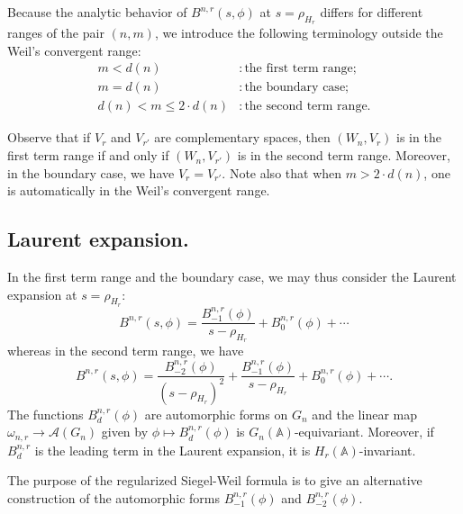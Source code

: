 \documentclass[10pt]{amsart}
\theoremstyle{plain}
\numberwithin{equation}{section}
\begin{document}
Because the analytic behavior of $B^{n,r}(s, \phi)$  at $s=\rho_{H_r}$
differs for different ranges of the pair $(n, m)$, we introduce the
following terminology outside the Weil's convergent range:
\begin{align*}
m<d(n)&:\text{the first term range};\\
m=d(n)&:\text{the boundary case};\\
d(n)<m\leq 2\cdot d(n)&:\text{the second term range}.
\end{align*}

Observe that if $V_r$ and $V_{r'}$ are complementary spaces, then
$(W_n, V_r)$ is in the first term range if and only if $(W_n, V_{r'})$
is in the second term range. Moreover, in the boundary case, we have
$V_r = V_{r'}$. Note also that when $m > 2 \cdot d(n)$, one is automatically in the Weil's convergent range.

\vskip 10pt
\subsection{\bf Laurent expansion.}
In the first term range and the boundary case, we may thus consider
the Laurent expansion at $s= \rho_{H_r}$: 
\[  B^{n,r}(s, \phi)  =  \frac{B^{n,r}_{-1}(\phi)}{s-\rho_{H_r}} +  B^{n,r}_0(\phi) + \cdots  \]
whereas in the second term range, we have
\[
 B^{n,r}(s, \phi)  =  \frac{B^{n,r}_{-2}(\phi)}{(s-\rho_{H_r})^2} +
   \frac{B^{n,r}_{-1}(\phi)}{s-\rho_{H_r}} +  B^{n,r}_0(\phi) + \cdots.
\]
The functions $B^{n,r}_d(\phi)$ are automorphic forms on $G_n$ and the
linear map $\omega_{n,r}\rightarrow{\mathcal{A}}(G_n)$ given by $\phi \mapsto 
B^{n,r}_d(\phi)$ is $G_n({\mathbb{A}})$-equivariant. Moreover, if $B^{n,r}_d$ is
the leading term in the Laurent expansion, it is $H_r({\mathbb{A}})$-invariant.
\vskip 5pt

The purpose of the regularized Siegel-Weil formula is to give an
alternative construction of the automorphic forms
$B^{n,r}_{-1}(\phi)$ and $B^{n,r}_{-2}(\phi)$. 
 \vskip 10pt
 
 
  
\end{document}
